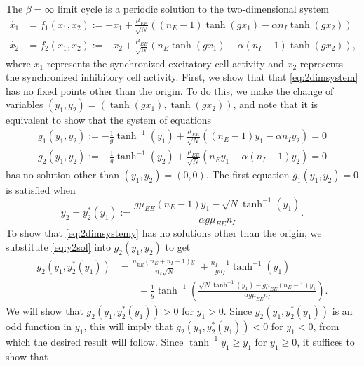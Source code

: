 \documentclass[reqno]{siamonline190516}
\begin{document}
The $\beta = \infty$ limit cycle is a periodic solution to the two-dimensional system
\begin{equation}\label{eq:2dimsystem}
\begin{aligned}
\dot{x_1} &= f_1(x_1, x_2) := -x_1 + \frac{\mu_{EE}}{\sqrt{N}}\left((n_E - 1) \tanh(g x_1) - \alpha n_I \tanh(g x_2) \right) \\
\dot{x_2} &= f_2(x_1, x_2) := -x_2 + \frac{\mu_{EE}}{\sqrt{N}}\left( n_E \tanh(g x_1) - \alpha (n_I - 1) \tanh(g x_2) \right), 
\end{aligned}
\end{equation}
where $x_1$ represents the synchronized excitatory cell activity and $x_2$ represents the synchronized inhibitory cell activity. First, we show that that \cref{eq:2dimsystem} has no fixed points other than the origin. To do this, we make the change of variables $(y_1, y_2) = (\tanh(g x_1),\tanh(g x_2))$, and note that it is equivalent to show that the system of equations
\begin{equation}\label{eq:2dimsystemy}
\begin{aligned}
g_1(y_1, y_2) := -\frac{1}{g}\tanh^{-1}(y_1) + \frac{\mu_{EE}}{\sqrt{N}}\left((n_E - 1) y_1 - \alpha n_I y_2 \right) = 0 \\
g_2(y_1, y_2) := -\frac{1}{g}\tanh^{-1}(y_2) + \frac{\mu_{EE}}{\sqrt{N}}\left( n_E y_1 - \alpha (n_I - 1) y_2 \right) = 0
\end{aligned}
\end{equation}
has no solution other than $(y_1, y_2) = (0,0)$. The first equation $g_1(y_1, y_2) = 0$ is satisfied when
\begin{equation}\label{eq:y2sol}
y_2 = y_2^*(y_1) := \frac{ g \mu_{EE} (n_E-1) y_1 - \sqrt{N} \tanh^{-1}(y_1)}{\alpha g \mu_{EE} n_I}.
\end{equation}
To show that \cref{eq:2dimsystemy} has no solutions other than the origin, we substitute \cref{eq:y2sol} into $g_2(y_1, y_2)$ to get 
\begin{equation}
\begin{aligned}
g_2(y_1, y_2^*(y_1)) &= \frac{\mu_{EE}( n_E + n_I - 1) y_1 }{n_I \sqrt{N}} + \frac{n_I - 1}{g n_I} \tanh^{-1}(y_1) \\
&\qquad+ \frac{1}{g} \tanh^{-1} \left( \frac{ \sqrt{N} \tanh^{-1}(y_1) - g \mu_{EE}(n_E -1) y_1}{ \alpha g \mu_{EE} n_I } \right).
\end{aligned}
\end{equation}    
We will show that $g_2(y_1, y_2^*(y_1)) > 0$ for $y_1 > 0$. Since $g_2(y_1, y_2^*(y_1))$ is an odd function in $y_1$, this will imply that $g_2(y_1, y_2^*(y_1)) < 0$ for $y_1 < 0$, from which the desired result will follow. Since $\tanh^{-1}y_1 \geq y_1$ for $y_1 \geq 0$, it suffices to show that
\end{document}
